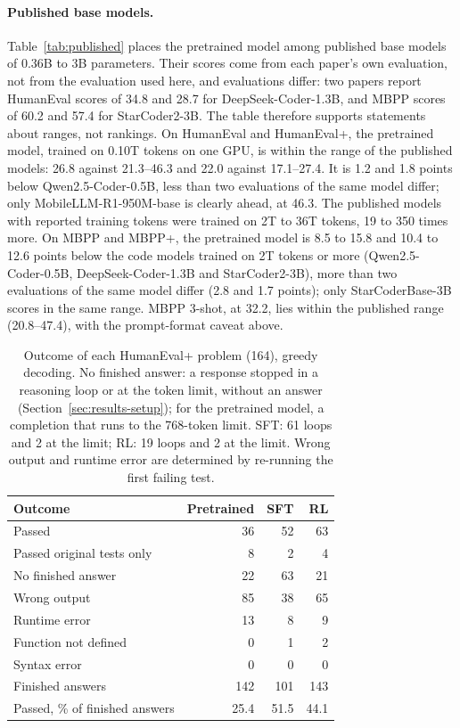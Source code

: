 \documentclass[sigconf,nonacm,balance=false]{acmart}
\begin{document}
\paragraph{Published base models.} Table~\ref{tab:published} places the pretrained model among published base models
of 0.36B to 3B parameters. Their scores come from each paper's own evaluation, not from the evaluation used here, and
evaluations differ: two papers report HumanEval scores of 34.8 and 28.7 for DeepSeek-Coder-1.3B, and MBPP scores of
60.2 and 57.4 for StarCoder2-3B. The table therefore supports statements about ranges, not rankings. On HumanEval and
HumanEval+, the pretrained model, trained on 0.10T tokens on one GPU, is within the range of the published models:
26.8 against 21.3--46.3 and 22.0 against 17.1--27.4. It is 1.2 and 1.8 points below Qwen2.5-Coder-0.5B, less than two
evaluations of the same model differ; only MobileLLM-R1-950M-base is clearly ahead, at 46.3. The published models with
reported training tokens were trained on 2T to 36T tokens, 19 to 350 times more. On MBPP and MBPP+, the pretrained
model is 8.5 to 15.8 and 10.4 to 12.6 points below the code models trained on 2T tokens or more (Qwen2.5-Coder-0.5B,
DeepSeek-Coder-1.3B and StarCoder2-3B), more than two evaluations of the same model differ (2.8 and 1.7 points); only
StarCoderBase-3B scores in the same range. MBPP 3-shot, at 32.2, lies within the published range (20.8--47.4), with
the prompt-format caveat above.

\begin{table}
  \caption{Outcome of each HumanEval+ problem (164), greedy decoding. No finished answer: a response stopped in a
  reasoning loop or at the token limit, without an answer (Section~\ref{sec:results-setup}); for the pretrained model,
  a completion that runs to the 768-token limit. SFT: 61 loops and 2 at the limit; RL: 19 loops and 2 at the limit.
  Wrong output and runtime error are determined by re-running the first failing test.}
  \label{tab:failures}
  \small
  \setlength{\tabcolsep}{4pt}
  \begin{tabular}{lrrr}
    \toprule
    Outcome & Pretrained & SFT & RL \\
    \midrule
    Passed & 36 & 52 & 63 \\
    Passed original tests only & 8 & 2 & 4 \\
    No finished answer & 22 & 63 & 21 \\
    Wrong output & 85 & 38 & 65 \\
    Runtime error & 13 & 8 & 9 \\
    Function not defined & 0 & 1 & 2 \\
    Syntax error & 0 & 0 & 0 \\
    \midrule
    Finished answers & 142 & 101 & 143 \\
    Passed, \% of finished answers & 25.4 & 51.5 & 44.1 \\
    \bottomrule
  \end{tabular}
\end{table}
\end{document}
